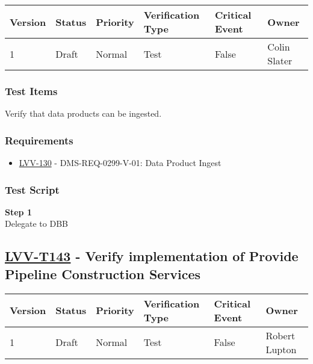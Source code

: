 \begin{longtable}[]{@{}llllll@{}}
\toprule
Version & Status & Priority & Verification Type & Critical Event &
Owner\tabularnewline
\midrule
\endhead
1 & Draft & Normal & Test & False & Colin Slater\tabularnewline
\bottomrule
\end{longtable}

\subsubsection{Test Items}\label{test-items-14}

Verify that data products can be ingested.

\subsubsection{Requirements}\label{requirements-14}

\begin{itemize}
\tightlist
\item
  \href{https://jira.lsstcorp.org/browse/LVV-130}{LVV-130} -
  DMS-REQ-0299-V-01: Data Product Ingest
\end{itemize}

\subsubsection{Test Script}\label{test-script-14}

\textbf{Step 1}\\
Delegate to DBB\\[2\baselineskip]

\hypertarget{lvv-t143---verify-implementation-of-provide-pipeline-construction-services}{\subsection{\texorpdfstring{\href{https://jira.lsstcorp.org/secure/Tests.jspa\#/testCase/LVV-T143}{LVV-T143}
- Verify implementation of Provide Pipeline Construction
Services}{LVV-T143 - Verify implementation of Provide Pipeline Construction Services}}\label{lvv-t143---verify-implementation-of-provide-pipeline-construction-services}}

\begin{longtable}[]{@{}llllll@{}}
\toprule
Version & Status & Priority & Verification Type & Critical Event &
Owner\tabularnewline
\midrule
\endhead
1 & Draft & Normal & Test & False & Robert Lupton\tabularnewline
\bottomrule
\end{longtable}

